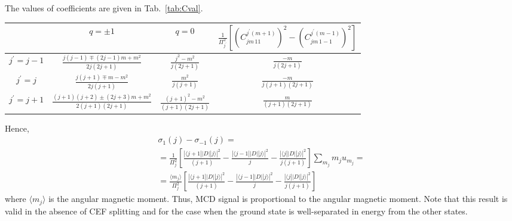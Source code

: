 \documentclass[a4paper,oneside,12pt]{extarticle}
\begin{document}
%
The values of coefficients are given in Tab.~\ref{tab:Cval}.
\begin{table*}[h]
	\begin{center}
		\begin{tabular}{c|c|c|c}
   & $q=\pm 1$ & $q=0$ & $\frac{1}{\Pi^2_{j^{\prime}}}\left[\left( C_{j m \, 1 1}^{j^{\prime} (m+1)}\right)^2 - \left( C_{j m \, 1 -1}^{j^{\prime} (m-1)}\right)^2\right]$\\
\hline	
$j^{\prime} = j-1$ & \large $\frac{j(j-1) \mp(2j-1)m + m^2}{2j(2j+1)}$ & \large $\frac{j^2-m^2}{j(2j+1)}$ & \large $\frac{-m}{j(2j+1)}$ \\
\hline
$j^{\prime} = j$ & \large $\frac{j(j+1) \mp m - m^2}{2j(j+1)}$ & \large $\frac{m^2}{j(j+1)}$ & \large $\frac{-m}{j(j+1)(2j+1)}$ \\
\hline
$j^{\prime} = j+1$ & \large $\frac{(j+1)(j+2) \pm (2j+3)m + m^2}{2(j+1)(2j+1)}$ & \large $\frac{(j+1)^2-m^2}{(j+1)(2j+1)}$ & \large $\frac{m}{(j+1)(2j+1)}$
		\end{tabular}
	\end{center}
	\caption{Values of coefficients $\left(C_{j m \, 1 q}^{j^{\prime} (m+q)}\right)^2$.}
	\label{tab:Cval}
\end{table*}

Hence,
\begin{multline}
\sigma_1 (j) -\sigma_{-1}(j) = \\ =
\frac{1}{\Pi_{j}^2}
\left[ \frac{|\langle j+1 || D || j \rangle|^2}{(j+1)}
- \frac{|\langle j-1 || D || j \rangle|^2}{j} 
-\frac{|\langle j || D || j \rangle|^2}{j(j+1)} \right]
\sum_{m_j } m_j u_{m_j} = \\ =
\frac{\langle m_j \rangle}{\Pi_{j}^2}
\left[ \frac{|\langle j+1 || D || j \rangle|^2}{(j+1)}
- \frac{|\langle j-1 || D || j \rangle|^2}{j} 
-\frac{|\langle j || D || j \rangle|^2}{j(j+1)} \right]
\end{multline}
%
where $\langle m_j \rangle$ is the angular magnetic moment. Thus, MCD signal is proportional to the angular magnetic moment. Note that this result is valid in the absence of CEF splitting and for the case when the ground state is well-separated in energy from the other states.
%
\end{document}
